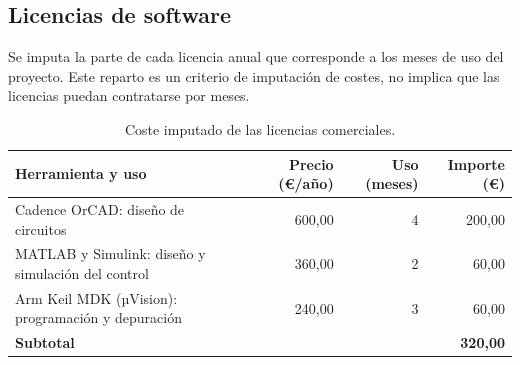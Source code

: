 \begin{samepage}
  \subsection{Licencias de software}
  \label{sec:presupuesto-software}

  Se imputa la parte de cada licencia anual que corresponde a los meses
  de uso del proyecto. Este reparto es un criterio de imputación de costes,
  no implica que las licencias puedan contratarse por meses.

  \nopagebreak
  \begin{table}[H]
    \caption{Coste imputado de las licencias comerciales.}
    \label{tab:recursos_software}
    \begin{tabularx}{\linewidth}{@{}>{\raggedright\arraybackslash}X r r r@{}}
      \hline
      \textbf{Herramienta y uso}                         & \textbf{Precio (€/año)} & \textbf{Uso (meses)} & \textbf{Importe (€)} \\
      \hline
      Cadence OrCAD: diseño de circuitos                 &                  600,00 &                    4 &               200,00 \\
      MATLAB y Simulink: diseño y simulación del control &                  360,00 &                    2 &                60,00 \\
      Arm Keil MDK (µVision): programación y depuración  &                  240,00 &                    3 &                60,00 \\
      \hline
      \textbf{Subtotal}                                  &                         &                      &      \textbf{320,00} \\
      \hline
    \end{tabularx}
  \end{table}
\end{samepage}
\pagebreak[0]

